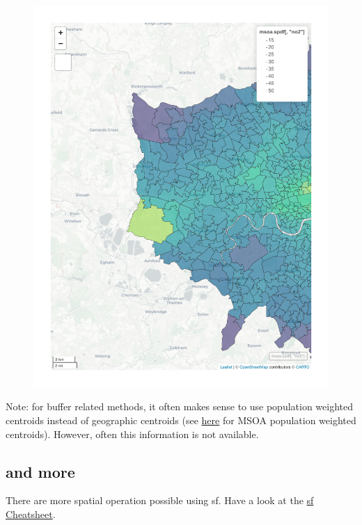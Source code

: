 \documentclass[
  letterpaper,
]{scrbook}
\begin{document}
\begin{figure}[H]

{\centering \includegraphics{02_spatial-data_files/figure-pdf/unnamed-chunk-13-1.pdf}

}

\end{figure}

Note: for buffer related methods, it often makes sense to use population
weighted centroids instead of geographic centroids (see
\href{https://geoportal.statistics.gov.uk/datasets/ons::middle-layer-super-output-areas-december-2011-population-weighted-centroids/about}{here}
for MSOA population weighted centroids). However, often this information
is not available.

\hypertarget{and-more}{%
\subsection{and more}\label{and-more}}

There are more spatial operation possible using sf. Have a look at the
\href{fig/sf.pdf}{sf Cheatsheet}.
\end{document}
